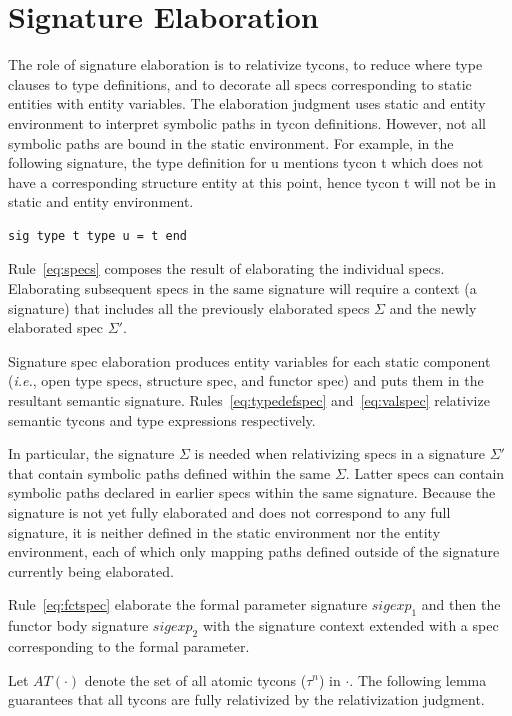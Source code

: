 \section{Signature Elaboration}
The role of signature elaboration is to relativize tycons, to reduce where type clauses to type definitions, and to decorate all specs corresponding to static entities with  entity variables. The elaboration judgment uses static and entity environment to interpret symbolic paths in tycon definitions. However, not all symbolic paths are bound in the static environment. For example, in the following signature, the type definition for u mentions tycon t which does not have a corresponding structure entity at this point, hence tycon t will not be in static and entity environment. 

\begin{lstlisting}
sig type t type u = t end
\end{lstlisting}

Rule~\ref{eq:specs} composes the result of elaborating the individual specs. Elaborating subsequent specs in the same signature will require a context (a signature) that includes all the previously elaborated specs $\Sigma$ and the newly elaborated spec $\Sigma'$.  

   

Signature spec elaboration produces entity variables for each static
component (\emph{i.e.}, open type specs, structure spec, and functor
spec) and puts them in the resultant semantic
signature. Rules~\ref{eq:typedefspec} and~\ref{eq:valspec} relativize
semantic tycons and type expressions respectively. 

In particular, the signature $\Sigma$ is needed when relativizing specs in a signature $\Sigma'$ that contain symbolic paths defined within the same $\Sigma$. Latter specs can contain symbolic paths declared in earlier specs within the same signature. Because the signature is not yet fully elaborated and does not correspond to any full signature, it is neither defined in the static environment nor the entity environment, each of which only mapping paths defined outside of the signature currently being elaborated. 


Rule~\ref{eq:fctspec} elaborate the formal parameter signature $sigexp_1$ and then the functor body signature $sigexp_2$ with the signature context extended with a spec corresponding to the formal parameter. 

Let $AT(\cdot)$ denote the set of all atomic tycons ($\tau^n$) in $\cdot$. 
The following lemma guarantees that all tycons are fully relativized by the relativization judgment. 

